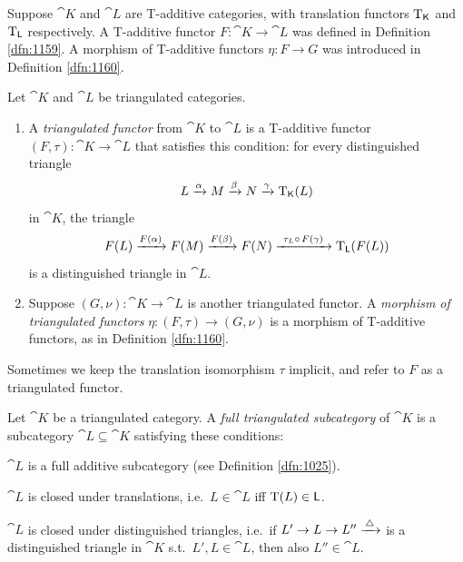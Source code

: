 \label{subsec:tr-coh-funcs}

Suppose $\cat{K}$ and $\cat{L}$ are T-additive categories, with 
translation functors
$\operatorname{T}_{\operatorname{\mathsf{K}}}$ and $\operatorname{T}_{\operatorname{\mathsf{L}}}$ respectively. 
A T-additive functor $F : \cat{K} \to \cat{L}$ was defined in Definition 
\ref{dfn:1159}. A morphism of T-additive functors $\eta : F \to G$ was 
introduced in Definition \ref{dfn:1160}.

\begin{dfn} \label{dfn:1276}
Let  $\cat{K}$ and $\cat{L}$  be triangulated categories. 
\begin{enumerate}
\item A {\em triangulated functor} 
from $\cat{K}$ to $\cat{L}$
is a T-additive functor 
$(F, \tau) : \cat{K} \to \cat{L}$ 
that satisfies this condition: for every distinguished triangle 
\[ L \xrightarrow{\alpha} M \xrightarrow{\beta} N \xrightarrow{\gamma} \operatorname{T}_{\operatorname{\mathsf{K}}}(L) \]
in $\cat{K}$, the triangle 
\[ F(L) \xrightarrow{F(\alpha)} F(M)  \xrightarrow{F(\beta)} F(N)  
\xrightarrow{ \ \tau_L \circ \, F(\gamma) \ } \operatorname{T}_{\operatorname{\mathsf{L}}}(F(L)) \]
is a distinguished triangle in $\cat{L}$.

\item Suppose $(G, \nu) : \cat{K} \to \cat{L}$ is another triangulated functor.
A {\em morphism of triangulated functors}
$\eta : (F, \tau) \to (G , \nu)$ is 
a morphism of T-additive functors, as in Definition \ref{dfn:1160}.
\end{enumerate}
\end{dfn}

Sometimes we keep the translation isomorphism $\tau$ implicit, and refer to $F$ 
as a triangulated functor.

\begin{dfn}  \label{dfn:1450}
Let $\cat{K}$ be a triangulated category. A 
{\em full triangulated subcategory}%
of $\cat{K}$ is a subcategory 
$\cat{L} \subseteq \cat{K}$ satisfying these conditions:
\begin{enumerate}
 $\cat{L}$ is a full additive subcategory (see Definition 
\ref{dfn:1025}). 

$\cat{L}$ is closed under translations, i.e.\ $L \in \cat{L}$ iff
$\operatorname{T}(L) \in \operatorname{\mathsf{L}}$.

 $\cat{L}$ is closed under distinguished triangles, i.e.\ if 
$L' \to L \to L'' \xrightarrow{\, \triangle\, }$ 
is a  distinguished triangle in $\cat{K}$ s.t.\ $L', L \in \cat{L}$, then 
also $L'' \in \cat{L}$.
\end{enumerate}
\end{dfn}

